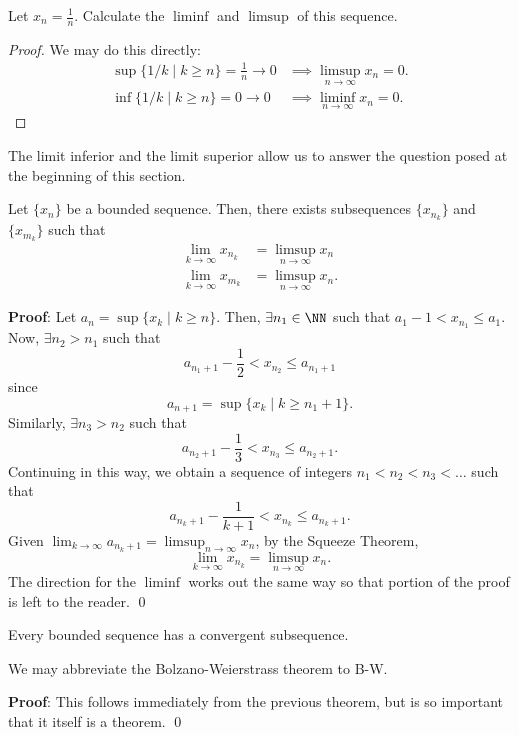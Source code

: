 \begin{example}
Let $x_n = \frac{1}{n}$. Calculate the $\liminf$ and $\limsup$ of this sequence.
\end{example}
\begin{proof}
We may do this directly:
\begin{align*}
    \sup\{1/k \mid k\geq n\} = \frac{1}{n}\to 0 &\implies \limsup_{n\to \infty} x_n = 0. \\
    \inf\{1/k\mid k \geq n\} = 0 \to 0 &\implies \liminf_{n\to \infty} x_n = 0.
\end{align*}
\end{proof}

The limit inferior and the limit superior allow us to answer the question posed at the beginning of this section.
\begin{theorem}
Let $\{x_n\}$ be a bounded sequence. Then, there exists subsequences $\{x_{n_k}\}$ and $\{x_{m_k}\}$ such that 
\begin{align*}
    \lim_{k\to \infty} x_{n_k} &= \limsup_{n\to \infty} x_n \\
    \lim_{k\to \infty} x_{m_k} &= \limsup_{n\to \infty} x_n.
\end{align*}
\end{theorem}
\textbf{Proof}: Let $a_n = \sup\{x_k \mid k\geq n\}.$ Then, $\exists n_1 \in \NN$ such that $a_1 -1 < x_{n_1} \leq a_1$. Now, $\exists n_2>n_1$ such that
\[
a_{n_1+1}-\frac{1}{2} < x_{n_2} \leq a_{n_1+1}
\]
since 
\[
a_{n+1} = \sup \{x_k \mid k\geq n_1 +1\}.
\]
Similarly, $\exists n_3>n_2$ such that
\[
a_{n_2+1}-\frac{1}{3} < x_{n_3} \leq a_{n_2+1}.
\]
Continuing in this way, we obtain a sequence of integers $n_1< n_2 < n_3< \dots$ such that 
\[
a_{n_k+1} - \frac{1}{k+1} < x_{n_k} \leq a_{n_k+1}.
\]
Given $\lim_{k\to \infty} a_{n_k +1} = \limsup_{n\to \infty} x_n$, by the Squeeze Theorem, 
\[
\lim_{k\to \infty} x_{n_k} = \limsup_{n\to \infty} x_n.
\]
The direction for the $\liminf$ works out the same way so that portion of the proof is left to the reader. \qed 

\begin{theorem}
Every bounded sequence has a convergent subsequence.
\end{theorem}
\begin{remark}
We may abbreviate the Bolzano-Weierstrass theorem to B-W.
\end{remark}

\noindent\textbf{Proof}: This follows immediately from the previous theorem, but is so important that it itself is a theorem. \qed 

